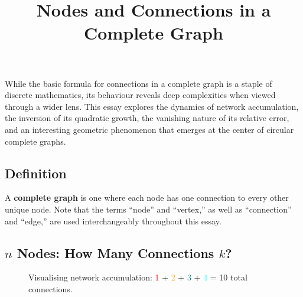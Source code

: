 \documentclass[
  12pt,
  letterpaper,
]{article}
\title{Nodes and Connections in a Complete Graph}
\author{}
\date{}
\theoremstyle{plain}
\theoremstyle{definition}
\begin{document}
\maketitle


While the basic formula for connections in a complete graph is a staple
of discrete mathematics, its behaviour reveals deep complexities when
viewed through a wider lens. This essay explores the dynamics of network
accumulation, the inversion of its quadratic growth, the vanishing
nature of its relative error, and an interesting geometric phenomenon
that emerges at the center of circular complete graphs.

\subsection{Definition}\label{definition}

A \textbf{complete graph} is one where each node has one connection to
every other unique node. Note that the terms ``node'' and ``vertex,'' as
well as ``connection'' and ``edge,'' are used interchangeably throughout
this essay.

\subsection{\texorpdfstring{\(n\) Nodes: How Many Connections
\(k\)?}{n Nodes: How Many Connections k?}}\label{n-nodes-how-many-connections-k}

\begin{figure}[H]
\centering
{}
\caption{Visualising network accumulation: \textcolor{red}{1} + \textcolor{orange}{2} + \textcolor{teal}{3} + \textcolor{cyan}{4} = 10 total connections.}
\label{fig:colored_graph}
\end{figure}
\end{document}
